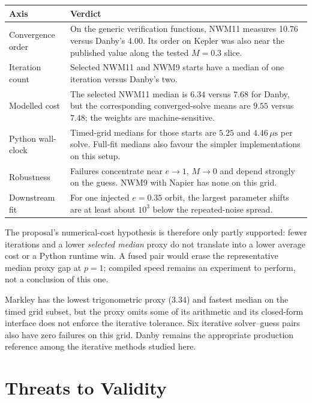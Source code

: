 \documentclass[11pt,a4paper]{article}
\begin{document}
\begin{center}
\small
\begin{tabularx}{\textwidth}{@{}>{\raggedright\arraybackslash}p{2.4cm} >{\raggedright\arraybackslash}X@{}}
\toprule
\textbf{Axis} & \textbf{Verdict} \\
\midrule
Convergence order & On the generic verification functions, NWM11 measures 10.76 versus Danby's 4.00. Its order on Kepler was also near the published value along the tested $M=0.3$ slice. \\
Iteration count & Selected NWM11 and NWM9 starts have a median of one iteration versus Danby's two. \\
Modelled cost & The selected NWM11 median is $6.34$ versus $7.68$ for Danby, but the corresponding converged-solve means are $9.55$ versus $7.48$; the weights are machine-sensitive. \\
Python wall-clock & Timed-grid medians for those starts are $5.25$ and $4.46\,\mu\mathrm{s}$ per solve. Full-fit medians also favour the simpler implementations on this setup. \\
Robustness & Failures concentrate near $e\rightarrow1$, $M\rightarrow0$ and depend strongly on the guess. NWM9 with Napier has none on this grid. \\
Downstream fit & For one injected $e=0.35$ orbit, the largest parameter shifts are at least about $10^3$ below the repeated-noise spread. \\
\bottomrule
\end{tabularx}
\end{center}

The proposal's numerical-cost hypothesis is therefore only partly
supported: fewer iterations and a lower \emph{selected median} proxy do
not translate into a lower average cost or a Python runtime win. A fused
pair would erase the representative median proxy gap at $p=1$; compiled
speed remains an experiment to perform, not a conclusion of this one.

Markley has the lowest trigonometric proxy ($3.34$) and fastest median
on the timed grid subset, but the proxy omits some of its arithmetic and
its closed-form interface does not enforce the iterative tolerance.
Six iterative solver--guess pairs also have zero failures on this grid.
Danby remains the appropriate production reference among the iterative
methods studied here.

\section{Threats to Validity}
\end{document}
